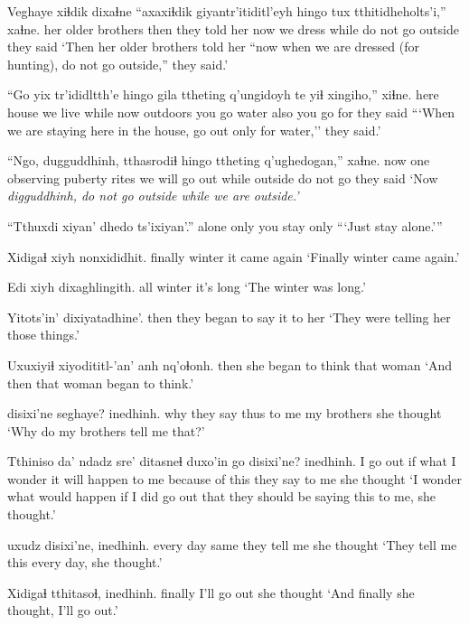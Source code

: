 \documentclass[12pt]{article}
\begin{document}
\gll Veghaye xiɬdik dixaɬne ``axaxiɬdik giyantr'itiditl'eyh {hingo tux} {tthitidheholts'i,''} xaɬne.
{her older brothers} then {they told her} now  {we dress} while  {do not go outside}  {they said}
\glt `Then her older brothers told her ``now when we are dressed (for hunting), do not go outside,'' they said.'
\glend

\gll ``Go yix tr'ididltth'e hingo gila ttheting q'ungidoyh te yiɬ xingiho,'' xiɬne.
here house {we live} while now outdoors {you go} water also {you go for} {they said}
\glt ```When we are staying here in the house, go out only for water,'' they said.'
\glend

\gll ``Ngo, dugguddhinh, tthasrodiɬ hingo ttheting q'ughedogan,'' xaɬne.
now {one observing puberty rites} {we will go out} while outside  {do not go}  {they said}
\glt `Now \em digguddhinh, \em do not go outside while we are outside.'
\glend

\gll ``Tthuxdi xiyan' dhedo ts'ixiyan'.''
alone  only {you stay}  only
\glt ```Just stay alone.'''
\glend

\gll Xidigaɬ xiyh nonxididhit.
finally  winter {it came again}
\glt `Finally winter came again.'
\glend

\gll Edi xiyh dixaghlingith.
all winter {it's long}
\glt `The winter was long.'
\glend

\gll Yitots'in' dixiyatadhine'.
then  {they began to say it to her}
\glt `They were telling her those things.'
\glend

\gll Uxuxiyiɬ xiyodititl-'an' anh nq'oɬonh.
then  {she began to think} that woman
\glt `And then that woman began to think.'
\glend

 disixi'ne  seghaye? inedhinh.
why {they say thus to me} {my brothers} {she thought}
\glt `Why do my brothers tell me that?'
\glend

\gll Tthiniso da' ndadz sre'  ditasneɬ duxo'in go disixi'ne?  inedhinh.
{I go out} if what {I wonder} {it will happen to me} {because of} this {they say to me} {she thought}
\glt `I wonder what would happen if I did go out that they should be saying this to me, she thought.'
\glend

 uxudz  disixi'ne, inedhinh.
{every day} same {they tell me} {she thought}
\glt `They tell me this every day, she thought.'
\glend

\gll Xidigaɬ tthitasoɬ, inedhinh.
finally {I'll go out} {she thought}
\glt `And finally she thought, I'll go out.'
\glend
\end{document}
